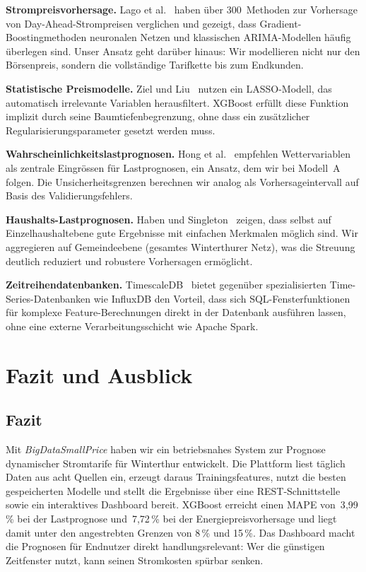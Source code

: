 \documentclass[sigconf]{acmart}
\begin{document}
\textbf{Strompreisvorhersage.}
Lago et al.~\cite{Lago2021} haben \"uber 300~Methoden zur Vorhersage von
Day-Ahead-Strompreisen verglichen und gezeigt, dass Gradient-Boosting\-methoden
neuronalen Netzen und klassischen ARIMA-Modellen h\"aufig \"uberlegen sind.
Unser Ansatz geht dar\"uber hinaus: Wir modellieren nicht nur den B\"orsenpreis,
sondern die vollst\"andige Tarifkette bis zum Endkunden.

\textbf{Statistische Preismodelle.}
Ziel und Liu~\cite{Ziel2016} nutzen ein LASSO-Modell, das automatisch
irrelevante Variablen herausfiltert.
XGBoost erf\"ullt diese Funktion implizit durch seine Baumtiefenbegrenzung,
ohne dass ein zus\"atzlicher Regularisierungsparameter gesetzt werden muss.

\textbf{Wahrscheinlichkeits\-lastprognosen.}
Hong et al.~\cite{Hong2016} empfehlen Wettervariablen als zentrale
Eingr\"ossen f\"ur Lastprognosen, ein Ansatz, dem wir bei Modell~A folgen.
Die Unsicherheitsgrenzen berechnen wir analog als Vorhersage\-intervall
auf Basis des Validierungsfehlers.

\textbf{Haushalts-Lastprognosen.}
Haben und Singleton~\cite{Haben2013} zeigen, dass selbst auf Einzelhaushalt\-ebene
gute Ergebnisse mit einfachen Merkmalen m\"oglich sind.
Wir aggregieren auf Gemeindeebene (gesamtes Winterthurer Netz), was die
Streuung deutlich reduziert und robustere Vorhersagen erm\"oglicht.

\textbf{Zeitreihendatenbanken.}
TimescaleDB~\cite{TimescaleDB2017} bietet gegen\"uber spezialisierten
Time-Series-Datenbanken wie InfluxDB den Vorteil, dass sich SQL-Fensterfunktionen
f\"ur komplexe Feature-Berechnungen direkt in der Datenbank ausf\"uhren lassen,
ohne eine externe Verarbeitungs\-schicht wie Apache Spark.

\section{Fazit und Ausblick}

\subsection{Fazit}

Mit \emph{BigDataSmallPrice} haben wir ein betriebsnahes System zur Prognose
dynamischer Stromtarife f\"ur Winterthur entwickelt.
Die Plattform liest t\"aglich Daten aus acht Quellen ein, erzeugt daraus
Trainingsfeatures, nutzt die besten gespeicherten Modelle und stellt die
Ergebnisse \"uber eine REST-Schnittstelle sowie ein interaktives Dashboard
bereit.
XGBoost erreicht einen MAPE von~3{,}99\,\% bei der Lastprognose und~7{,}72\,\%
bei der Energiepreisvorhersage und liegt damit unter den angestrebten
Grenzen von 8\,\% und 15\,\%.
Das Dashboard macht die Prognosen f\"ur Endnutzer direkt handlungs\-relevant:
Wer die g\"unstigen Zeitfenster nutzt, kann seinen Stromkosten sp\"urbar senken.
\end{document}
